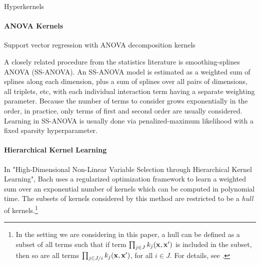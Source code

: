 \documentclass[twoside]{article}
\begin{document}
Hyperkernels \cite{ong2002hyperkernels}

\paragraph{ANOVA Kernels}

Support vector regression with ANOVA decomposition kernels \cite{stitson1999support}

A closely related procedure from the statistics literature is smoothing-splines ANOVA (SS-ANOVA)\cite{wahba1990spline, gu2002smoothing}.
An SS-ANOVA model is estimated as a weighted sum of splines along each dimension, plus a sum of splines over all pairs of dimensions, all triplets, etc, with each individual interaction term having a separate weighting parameter.
Because the number of terms to consider grows exponentially in the order, in practice, only terms of first and second order are usually considered.
Learning in SS-ANOVA is usually done via penalized-maximum likelihood with a fixed sparsity hyperparameter.

\paragraph{Hierarchical Kernel Learning}

In "High-Dimensional Non-Linear Variable Selection through Hierarchical Kernel Learning", Bach\cite{DBLP:journals/corr/abs-0909-0844} uses a regularized optimization framework to learn a weighted sum over an exponential number of kernels which can be computed in polynomial time.
The subsets of kernels considered by this method are restricted to be a \textit{hull} of kernels.\footnote{In the setting we are considering in this paper, a hull can be defined as a subset of all terms such that if term $\prod_{j \in J} k_j(\bf x, x')$ is included in the subset, then so are all terms $\prod_{j \in J / i} k_j(\bf x, x')$, for all $i \in J$.
For details, see \cite{DBLP:journals/corr/abs-0909-0844}.}
\end{document}
